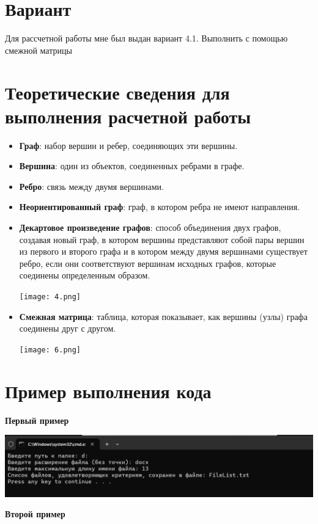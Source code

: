 \documentclass[a4paper,12pt]{article}
\begin{document}
\section*{Вариант}
Для рассчетной работы мне был выдан вариант 4.1. Выполнить с помощью смежной матрицы


\section*{Теоретические сведения для выполнения расчетной работы}
\begin{itemize}
    \item \textbf{Граф}: набор вершин и ребер, соединяющих эти вершины.
    \item \textbf{Вершина}: один из объектов, соединенных ребрами в графе.
    \item \textbf{Ребро}: связь между двумя вершинами.
    \item \textbf{Неориентированный граф}: граф, в котором ребра не имеют направления.
    \item \textbf {Декартовое произведение графов}: способ объединения двух графов, создавая новый граф, в котором вершины представляют собой пары вершин из первого и второго графа и в котором между двумя вершинами существует ребро, если они соответствуют вершинам исходных графов, которые соединены определенным образом.
    
    \texttt{[image: 4.png]}
    \item \textbf{Смежная матрица}: таблица, которая показывает, как вершины (узлы) графа соединены друг с другом.

    \texttt{[image: 6.png]}
    
\end{itemize}




\section*{Пример выполнения кода}
  \setlength{\parskip}{0.2cm}
\item \textbf{Первый пример}
  \setlength{\parskip}{0.2cm}

 \includegraphics[width=0.9\columnwidth]{1.png}
 \item \textbf{Второй пример}
  \setlength{\parskip}{0.2cm}
  
\end{document}
